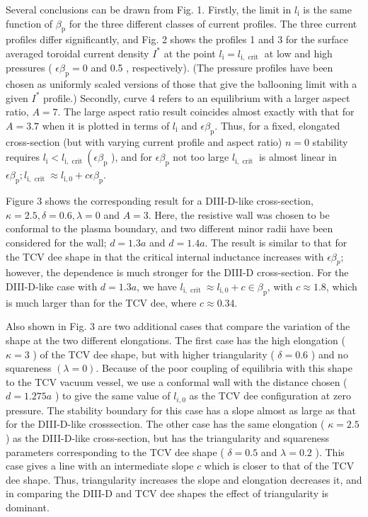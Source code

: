 \documentclass[utf8]{ctexart}
\begin{document}
\begin{sloppypar}
 
 Several conclusions can be drawn from Fig. 1. Firstly, the limit in $l_{\mathrm{i}}$ is the same function of $\beta_{\mathrm{p}}$ for the three different classes of current profiles. The three current profiles differ significantly, and Fig. 2 shows the profiles 1 and 3 for the surface averaged toroidal current density $I^{*}$ at the point $l_{\mathrm{i}}=l_{\mathrm{i}, \text { crit }}$ at low and high pressures ( $\epsilon \beta_{\mathrm{p}}=0$ and 0.5 , respectively). (The pressure profiles have been chosen as uniformly scaled versions of those that give the ballooning limit with a given $I^{*}$ profile.) Secondly, curve 4 refers to an equilibrium with a larger aspect ratio, $A=7$. The large aspect ratio result coincides almost exactly with that for $A=3.7$ when it is plotted in terms of $l_{\mathrm{i}}$ and $\epsilon \beta_{\mathrm{p}}$. Thus, for a fixed, elongated cross-section (but with varying current profile and aspect ratio) $n=0$ stability requires $l_{\mathrm{i}}<l_{\mathrm{i}, \text { crit }}\left(\epsilon \beta_{\mathrm{p}}\right.$ ), and for $\epsilon \beta_{\mathrm{p}}$ not too large $l_{\mathrm{i}, \text { crit }}$ is almost linear in $\epsilon \beta_{\mathrm{p}} ; l_{\mathrm{i}, \text { crit }} \approx l_{\mathrm{i}, 0}+c \epsilon \beta_{\mathrm{p}}$.
 
 
 Figure 3 shows the corresponding result for a DIII-D-like cross-section, $\kappa=2.5, \delta=0.6, \lambda=0$ and $A=3$. Here, the resistive wall was chosen to be conformal to the plasma boundary, and two different minor radii have been considered for the wall; $d=1.3 a$ and $d=1.4 a$. The result is similar to that for the TCV dee shape in that the critical internal inductance increases with $\epsilon \beta_{p}$; however, the dependence is much stronger for the DIII-D cross-section. For the DIII-D-like case with $d=1.3 a$, we have $l_{\mathrm{i}, \text { crit }} \approx l_{\mathrm{i}, 0}+c \in \beta_{\mathrm{p}}$, with $c \approx 1.8$, which is much larger than for the TCV dee, where $c \approx 0.34$.
 
 Also shown in Fig. 3 are two additional cases that compare the variation of the shape at the two different elongations. The first case has the high elongation ( $\kappa=3$ ) of the TCV dee shape, but with higher triangularity ( $\delta=0.6$ ) and no squareness $(\lambda=0)$. Because of the poor coupling of equilibria with this shape to the TCV vacuum vessel, we use a conformal wall with the distance chosen ( $d=1.275 a$ ) to give the same value of $l_{i, 0}$ as the TCV dee configuration at zero pressure. The stability boundary for this case has a slope almost as large as that for the DIII-D-like crosssection. The other case has the same elongation ( $\kappa=2.5$ ) as the DIII-D-like cross-section, but has the triangularity and squareness parameters corresponding to the TCV dee shape ( $\delta=0.5$ and $\lambda=0.2$ ). This case gives a line with an intermediate slope $c$ which is closer to that of the TCV dee shape. Thus, triangularity increases the slope and elongation decreases it, and in comparing the DIII-D and TCV dee shapes the effect of triangularity is dominant.
 

\end{sloppypar}
\end{document}
